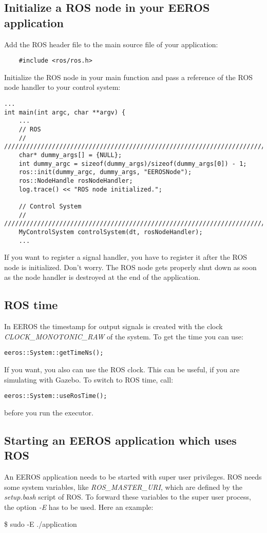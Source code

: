 \subsection{Initialize a ROS node in your EEROS application}
Add the ROS header file to the main source file of your application:
\lstset{language=c}
\begin{lstlisting}
	#include <ros/ros.h>
\end{lstlisting}

Initialize the ROS node in your main function and pass a reference of the ROS node handler to your control system:	
\lstset{language=c}
\begin{lstlisting}
...
int main(int argc, char **argv) {
	...
	// ROS
	// ////////////////////////////////////////////////////////////////////////
	char* dummy_args[] = {NULL};
	int dummy_argc = sizeof(dummy_args)/sizeof(dummy_args[0]) - 1;
 	ros::init(dummy_argc, dummy_args, "EEROSNode");
	ros::NodeHandle rosNodeHandler;
	log.trace() << "ROS node initialized.";
	
	// Control System
	// ////////////////////////////////////////////////////////////////////////
	MyControlSystem controlSystem(dt, rosNodeHandler);
	...
\end{lstlisting}

If you want to register a signal handler, you have to register it after the ROS node is initialized.
Don't worry.
The ROS node gets properly shut down as soon as the node handler is destroyed at the end of the application.


\subsection{ROS time}
In EEROS the timestamp for output signals is created with the clock \textit{CLOCK\_MONOTONIC\_RAW} of the system.
To get the time you can use:
\lstset{language=c}
\begin{lstlisting}
eeros::System::getTimeNs();
\end{lstlisting}

If you want, you also can use the ROS clock. 
This can be useful, if you are simulating with Gazebo.
To switch to ROS time, call:
\lstset{language=c}
\begin{lstlisting}
eeros::System::useRosTime();
\end{lstlisting}
before you run the executor.


\subsection{Starting an EEROS application which uses ROS}
An EEROS application needs to be started with super user privileges.
ROS needs some system variables, like \textit{ROS\_MASTER\_URI}, which are defined by the \textit{setup.bash} script of ROS.
To forward these variables to the super user process, the option \textit{-E} has to be used. Here an example:
\begin{snugshade*}
	\$ sudo -E ./application
\end{snugshade*}


